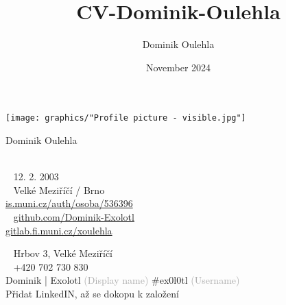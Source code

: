 \documentclass{modernsimplecv}
\title{CV-Dominik-Oulehla}
\author{Dominik Oulehla}
\date{November 2024}
\begin{document}
\thispagestyle{empty}




\begin{minipage}[t]{0.21\textwidth}

    \vspace{0pt} %

    \texttt{[image: graphics/"Profile picture - visible.jpg"]}\hspace{1em}

\end{minipage}
\hfill
\begin{minipage}[t]{0.77\textwidth}
    \vspace{0pt} %
    \begin{shaded*}
        \begin{minipage}[t]{0.4\textwidth}
            \vspace{0pt} %
            {\par\centering\huge\textsf{Dominik Oulehla}} \\[0.3cm]
            \faBirthdayCake~ 12. 2. 2003 \\
            \faMapMarker~ Velké Meziříčí / Brno \\
            {\small
             \protect\url{is.muni.cz/auth/osoba/536396} \\
            \faGithub~ \protect\url{github.com/Dominik-Exolotl} \\
             \protect\url{gitlab.fi.muni.cz/xoulehla}
            }
        \end{minipage}\hfill
        \begin{minipage}[t]{0.55\textwidth}
            \vspace{0pt}
            \faEnvelopeO~ Hrbov 3, Velké Meziříčí \\
            \faPhone~ +420 702 730 830 \\
             Dominik | Exolotl \scriptsize \textcolor{darkgrey}{(Display name)}\normalsize{ \#ex0l0tl} \scriptsize \textcolor{darkgrey}{(Username)} \normalsize\\
             \small{Přidat LinkedIN, až se dokopu k založení} \normalsize \\[0.175cm]

\end{minipage}
\end{shaded*}
\end{minipage}
\end{document}
